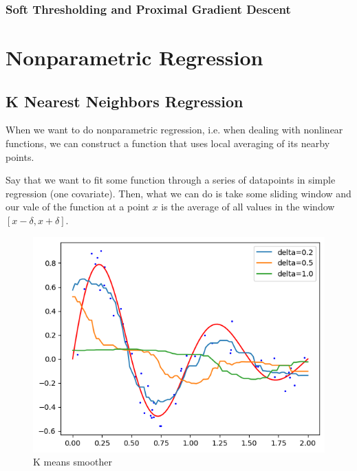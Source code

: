 \documentclass{article}
\begin{document}
    \subsubsection{Soft Thresholding and Proximal Gradient Descent} 

\section{Nonparametric Regression}

  \subsection{K Nearest Neighbors Regression}

    When we want to do nonparametric regression, i.e. when dealing with nonlinear functions, we can construct a function that uses local averaging of its nearby points. 

    \begin{example}
      Say that we want to fit some function through a series of datapoints in simple regression (one covariate). Then, what we can do is take some sliding window and our vale of the function at a point $x$ is the average of all values in the window $[x - \delta, x + \delta]$. 
      \begin{figure}[H]
        \centering 
        \includegraphics[scale=0.6]{img/kmeans_smoother.png}
        \caption{K means smoother} 
        \label{fig:kmeans_smoother}
      \end{figure}
    \end{example}
\end{document}
